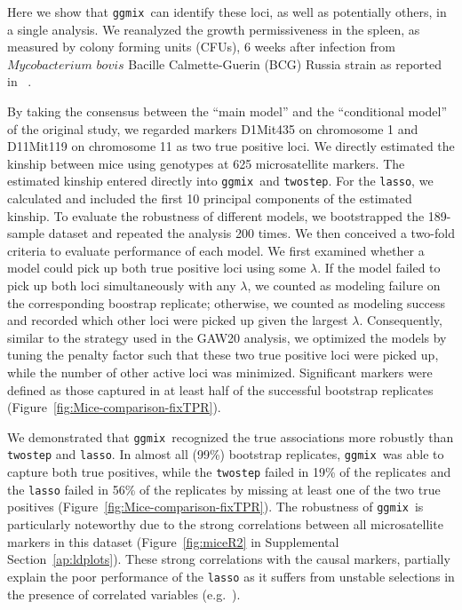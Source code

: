 \documentclass[12pt,letter]{article}\usepackage[]{graphicx}\usepackage[]{color}
\newcommand{\ggmix}{\texttt{ggmix}}
\begin{document}
Here we show that \ggmix ~can identify these loci, as well as potentially others, in a single analysis. We reanalyzed the growth permissiveness in the spleen, as measured by colony forming units (CFUs), 6 weeks after infection from $Mycobacterium$ $bovis$ Bacille Calmette-Guerin (BCG) Russia strain as reported in ~\citep{di2010strain}.

By taking the consensus between the ``main model'' and the ``conditional model'' of the original study, we regarded markers D1Mit435 on chromosome 1 and D11Mit119 on chromosome 11 as two true positive loci.
We directly estimated the kinship between mice using genotypes at 625 microsatellite markers. The estimated kinship entered directly into \ggmix ~and \texttt{twostep}. For the \texttt{lasso}, we calculated and included the first 10 principal components of the estimated kinship. To evaluate the robustness of different models, we bootstrapped the 189-sample dataset and repeated the analysis 200 times. We then conceived a two-fold criteria to evaluate performance of each model. We first examined whether a model could pick up both true positive loci using some $\lambda$. If the model failed to pick up both loci simultaneously with any $\lambda$, we counted as modeling failure on the corresponding boostrap replicate; otherwise, we counted as modeling success and recorded which other loci were picked up given the largest $\lambda$. Consequently, similar to the strategy used in the GAW20 analysis, we optimized the models by tuning the penalty factor such that these two true positive loci were picked up, while the number of other active loci was minimized.
Significant markers were defined as those captured in at least half of the successful bootstrap replicates (Figure~\ref{fig:Mice-comparison-fixTPR}).

We demonstrated that \ggmix ~recognized the true associations more robustly than \texttt{twostep} and \texttt{lasso}. In almost all (99\%) bootstrap replicates, \ggmix ~was able to capture both true positives, while the \texttt{twostep} failed in 19\% of the replicates and the \texttt{lasso} failed in 56\% of the replicates by missing at least one of the two true positives (Figure~\ref{fig:Mice-comparison-fixTPR}). The robustness of \ggmix ~is particularly noteworthy due to the strong correlations between all microsatellite markers in this dataset (Figure~\ref{fig:miceR2} in Supplemental Section~\ref{ap:ldplots}). These strong correlations with the causal markers, partially explain the poor performance of the \texttt{lasso} as it suffers from unstable selections in the presence of correlated variables (e.g.~\citep{wang2018precision}).
\end{document}
